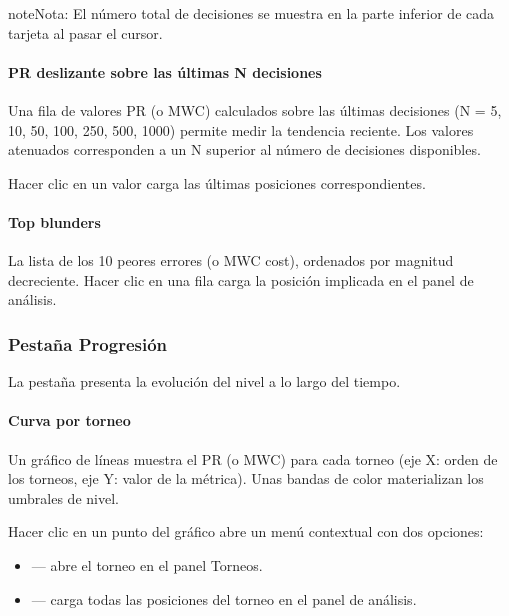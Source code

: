\documentclass[letterpaper,10pt,spanish]{sphinxmanual}
\begin{document}
\begin{sphinxadmonition}{note}{Nota:}
\sphinxAtStartPar
El número total de decisiones se muestra en la parte inferior de cada tarjeta al pasar el cursor.
\end{sphinxadmonition}


\paragraph{PR deslizante sobre las últimas N decisiones}
\label{\detokenize{manuel:pr-glissant-sur-n-dernieres-decisions}}
\sphinxAtStartPar
Una fila de valores PR (o MWC) calculados sobre las últimas  decisiones (N = 5, 10, 50, 100, 250, 500, 1000) permite medir la tendencia reciente. Los valores atenuados corresponden a un N superior al número de decisiones disponibles.

\sphinxAtStartPar
Hacer clic en un valor carga las últimas  posiciones correspondientes.


\paragraph{Top blunders}
\label{\detokenize{manuel:top-blunders}}
\sphinxAtStartPar
La lista de los 10 peores errores (o MWC cost), ordenados por magnitud decreciente. Hacer clic en una fila carga la posición implicada en el panel de análisis.


\subsubsection{Pestaña Progresión}
\label{\detokenize{manuel:onglet-progression}}
\sphinxAtStartPar
La pestaña  presenta la evolución del nivel a lo largo del tiempo.


\paragraph{Curva por torneo}
\label{\detokenize{manuel:courbe-par-tournoi}}
\sphinxAtStartPar
Un gráfico de líneas muestra el PR (o MWC) para cada torneo (eje X: orden de los torneos, eje Y: valor de la métrica). Unas bandas de color materializan los umbrales de nivel.

\sphinxAtStartPar
Hacer clic en un punto del gráfico abre un menú contextual con dos opciones:
\begin{itemize}
\item {} 
\sphinxAtStartPar
{} — abre el torneo en el panel Torneos.

\item {} 
\sphinxAtStartPar
{} — carga todas las posiciones del torneo en el panel de análisis.

\end{itemize}
\end{document}
